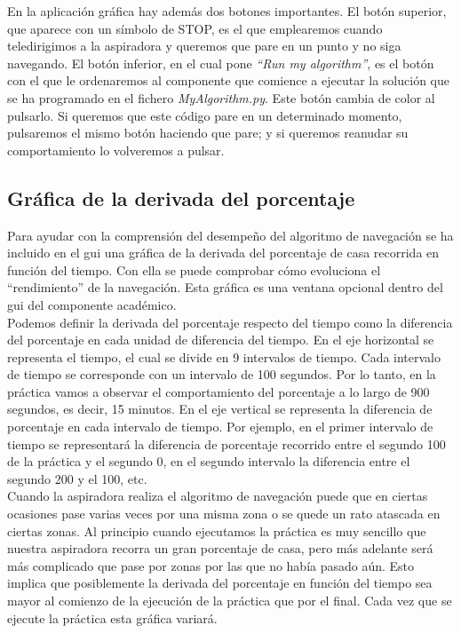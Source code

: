 En la aplicación gráfica hay además dos botones importantes. El botón superior, que aparece con un símbolo de STOP, es el que emplearemos cuando teledirigimos a la aspiradora y queremos que pare en un punto y no siga navegando. El botón inferior, en el cual pone \textit{``Run my algorithm''}, es el botón con el que le ordenaremos al componente que comience a ejecutar la solución que se ha programado en el fichero \textit{MyAlgorithm.py}. Este botón cambia de color al pulsarlo. Si queremos que este código pare en un determinado momento, pulsaremos el mismo botón haciendo que pare; y si queremos reanudar su comportamiento lo volveremos a pulsar.\\


\subsection{Gráfica de la derivada del porcentaje}
Para ayudar con la comprensión del desempeño del algoritmo de navegación se ha incluido en el \acrshort{gui} una gráfica de la derivada del porcentaje de casa recorrida en función del tiempo. Con ella se puede comprobar cómo evoluciona el ``rendimiento'' de la navegación. Esta gráfica es una ventana opcional dentro del \acrshort{gui} del componente académico. \\

Podemos definir la derivada del porcentaje respecto del tiempo como la diferencia del porcentaje en cada unidad de diferencia del tiempo. En el eje horizontal se representa el tiempo, el cual se divide en 9 intervalos de tiempo. Cada intervalo de tiempo se corresponde con un intervalo de 100 segundos. Por lo tanto, en la práctica vamos a observar el comportamiento del porcentaje a lo largo de 900 segundos, es decir, 15 minutos. En el eje vertical se representa la diferencia de porcentaje en cada intervalo de tiempo. Por ejemplo, en el primer intervalo de tiempo se representará la diferencia de porcentaje recorrido entre el segundo 100 de la práctica y el segundo 0, en el segundo intervalo la diferencia entre el segundo 200 y el 100, etc.\\

Cuando la aspiradora realiza el algoritmo de navegación puede que en ciertas ocasiones pase varias veces por una misma zona o se quede un rato atascada en ciertas zonas. Al principio cuando ejecutamos la práctica es muy sencillo que nuestra aspiradora recorra un gran porcentaje de casa, pero más adelante será más complicado que pase por zonas por las que no había pasado aún. Esto implica que posiblemente la derivada del porcentaje en función del tiempo sea mayor al comienzo de la ejecución de la práctica que por el final. Cada vez que se ejecute la práctica esta gráfica variará.\\

